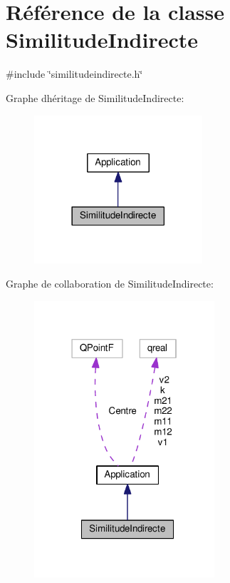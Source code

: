 \hypertarget{class_similitude_indirecte}{}\section{Référence de la classe Similitude\+Indirecte}
\label{class_similitude_indirecte}


{\ttfamily \#include \char`\"{}similitudeindirecte.\+h\char`\"{}}



Graphe d\textquotesingle{}héritage de Similitude\+Indirecte\+:\nopagebreak
\begin{figure}[H]
\begin{center}
\leavevmode
\includegraphics[width=177pt]{class_similitude_indirecte__inherit__graph}
\end{center}
\end{figure}


Graphe de collaboration de Similitude\+Indirecte\+:\nopagebreak
\begin{figure}[H]
\begin{center}
\leavevmode
\includegraphics[width=190pt]{class_similitude_indirecte__coll__graph}
\end{center}
\end{figure}
